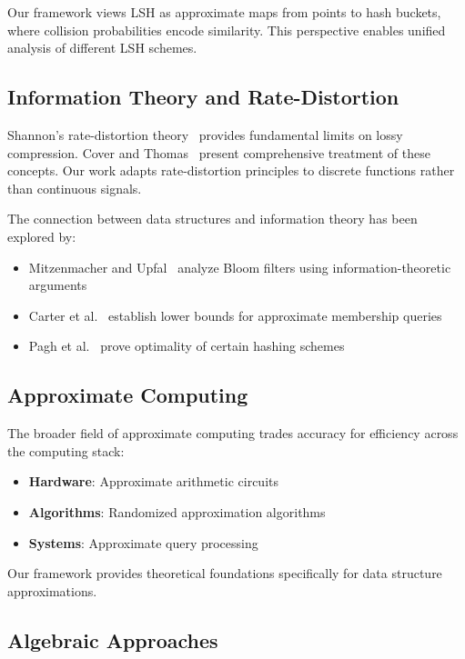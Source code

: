 Our framework views LSH as approximate maps from points to hash buckets, where collision probabilities encode similarity.
This perspective enables unified analysis of different LSH schemes.

\subsection{Information Theory and Rate-Distortion}

Shannon's rate-distortion theory~\cite{shannon1959} provides fundamental limits on lossy compression.
Cover and Thomas~\cite{cover2006} present comprehensive treatment of these concepts.
Our work adapts rate-distortion principles to discrete functions rather than continuous signals.

The connection between data structures and information theory has been explored by:
\begin{itemize}
    \item Mitzenmacher and Upfal~\cite{mitzenmacher2005} analyze Bloom filters using information-theoretic arguments
    \item Carter et al.~\cite{carter1978} establish lower bounds for approximate membership queries
    \item Pagh et al.~\cite{pagh2005} prove optimality of certain hashing schemes
\end{itemize}

\subsection{Approximate Computing}

The broader field of approximate computing trades accuracy for efficiency across the computing stack:
\begin{itemize}
    \item \textbf{Hardware}: Approximate arithmetic circuits~\cite{han2013}
    \item \textbf{Algorithms}: Randomized approximation algorithms~\cite{motwani1995}
    \item \textbf{Systems}: Approximate query processing~\cite{hellerstein1997}
\end{itemize}

Our framework provides theoretical foundations specifically for data structure approximations.

\subsection{Algebraic Approaches}

